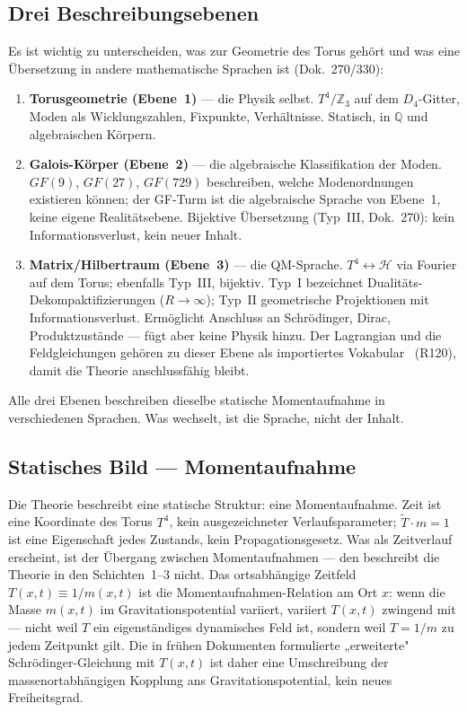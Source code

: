\subsection*{Drei Beschreibungsebenen}

Es ist wichtig zu unterscheiden, was zur Geometrie des Torus gehört und was
eine Übersetzung in andere mathematische Sprachen ist (Dok.~270/330):

\begin{enumerate}[nosep]
\item \textbf{Torusgeometrie (Ebene~1)} --- die Physik selbst. $T^4/\mathbb{Z}_3$
auf dem $D_4$-Gitter, Moden als Wicklungszahlen, Fixpunkte, Verhältnisse.
Statisch, in $\mathbb{Q}$ und algebraischen Körpern.
\item \textbf{Galois-Körper (Ebene~2)} --- die algebraische Klassifikation der
Moden. $GF(9)$, $GF(27)$, $GF(729)$ beschreiben, welche Modenordnungen
existieren können; der GF-Turm ist die algebraische Sprache von Ebene~1, keine
eigene Realitätsebene. Bijektive Übersetzung (Typ~III, Dok.~270): kein
Informationsverlust, kein neuer Inhalt.
\item \textbf{Matrix/Hilbertraum (Ebene~3)} --- die QM-Sprache.
$T^4 \leftrightarrow \mathcal{H}$ via Fourier auf dem Torus; ebenfalls
Typ~III, bijektiv. Typ~I bezeichnet Dualitäts-Dekompaktifizierungen ($R\to\infty$);
Typ~II geometrische Projektionen mit Informationsverlust. Ermöglicht Anschluss an Schrödinger, Dirac, Produktzustände
--- fügt aber keine Physik hinzu. Der Lagrangian und die Feldgleichungen gehören
zu dieser Ebene als importiertes Vokabular \EM\ (R120), damit die Theorie
anschlussfähig bleibt.
\end{enumerate}

Alle drei Ebenen beschreiben dieselbe statische Momentaufnahme in verschiedenen
Sprachen. Was wechselt, ist die Sprache, nicht der Inhalt.

\subsection*{Statisches Bild — Momentaufnahme}

Die Theorie beschreibt eine statische Struktur: eine Momentaufnahme. Zeit ist
eine Koordinate des Torus $T^4$, kein ausgezeichneter Verlaufsparameter;
$\tilde{T}\cdot m=1$ ist eine Eigenschaft jedes Zustands, kein
Propagationsgesetz. Was als Zeitverlauf erscheint, ist der Übergang zwischen
Momentaufnahmen --- den beschreibt die Theorie in den Schichten~1--3 nicht.
Das ortsabhängige Zeitfeld $T(x,t)\equiv1/m(x,t)$ ist die
Momentaufnahmen-Relation am Ort $x$: wenn die Masse $m(x,t)$ im
Gravitationspotential variiert, variiert $T(x,t)$ zwingend mit --- nicht weil
$T$ ein eigenständiges dynamisches Feld ist, sondern weil $T=1/m$ zu jedem
Zeitpunkt gilt. Die in frühen Dokumenten formulierte „erweiterte"
Schrödinger-Gleichung mit $T(x,t)$ ist daher eine Umschreibung der
massenortabhängigen Kopplung ans Gravitationspotential, kein neues
Freiheitsgrad.

